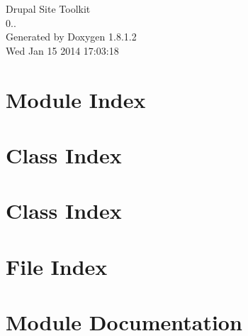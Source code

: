 \documentclass{book}
\begin{document}
\hypersetup{pageanchor=false,citecolor=blue}
\begin{titlepage}
\vspace*{7cm}
\begin{center}
{\Large Drupal Site Toolkit \\[1ex]\large 0.. }\\
\vspace*{1cm}
{\large Generated by Doxygen 1.8.1.2}\\
\vspace*{0.5cm}
{\small Wed Jan 15 2014 17:03:18}\\
\end{center}
\end{titlepage}
\clearemptydoublepage
{}
\tableofcontents
\clearemptydoublepage
{}
\hypersetup{pageanchor=true,citecolor=blue}
\chapter{Module Index}

\chapter{Class Index}

\chapter{Class Index}

\chapter{File Index}

\chapter{Module Documentation}














\end{document}
